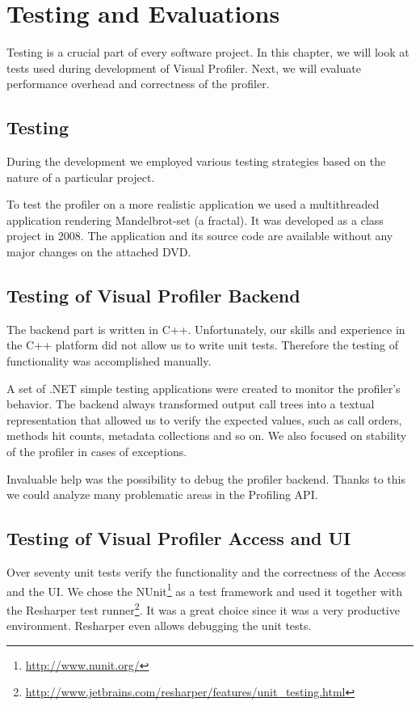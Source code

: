 \chapter{Testing and Evaluations}
\label{chap:07TestingEval}
Testing is a crucial part of every software project. In this chapter, we will look at tests used during development of Visual Profiler. Next, we will evaluate performance overhead and correctness of the profiler.

\section{Testing}
During the development we employed various testing strategies based on the nature of a particular project. 

To test the profiler on a more realistic application we used a multithreaded application rendering Mandelbrot-set (a fractal). It was developed as a class project in 2008. The application and its source code are available without any major changes on the attached DVD. 

\section{Testing of Visual Profiler Backend}
The backend part is written in C++. Unfortunately, our skills and experience in the C++ platform did not allow us to write unit tests. Therefore the testing of functionality was accomplished manually. 

A set of .NET simple testing applications were created to monitor  the profiler's behavior. The backend always transformed output call trees into a textual representation that allowed us to verify the expected values, such as call orders, methods hit counts, metadata collections and so on. We also focused on stability of the profiler in cases of exceptions.

Invaluable help was the possibility to debug the profiler backend. Thanks to this we could analyze many problematic areas in the Profiling API.

\section{Testing of Visual Profiler Access and UI}
Over seventy unit tests verify the functionality and the correctness of the Access and the UI. We chose the NUnit\footnote{\href{http://www.nunit.org/}{http://www.nunit.org/}} as a test framework and used it together with the Resharper test runner\footnote{\href{http://www.jetbrains.com/resharper/features/unit_testing.html}{http://www.jetbrains.com/resharper/features/unit\_testing.html}}. It was a great choice since it was a very productive environment. Resharper even allows debugging the unit tests.


